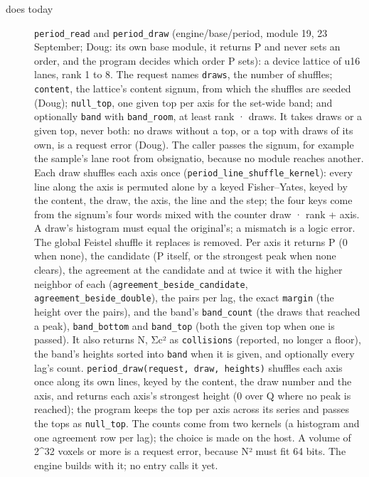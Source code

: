 \begin{description}
\item[{does today}] \texttt{period\_\allowbreak{}read} and \texttt{period\_\allowbreak{}draw} (engine/base/period, module 19, 23 September; Doug: its own base module, it returns P and never sets an order, and the program decides which order P sets): a device lattice of u16 lanes, rank 1 to 8. The request names \texttt{draws}, the number of shuffles; \texttt{content}, the lattice's content signum, from which the shuffles are seeded (Doug); \texttt{null\_\allowbreak{}top}, one given top per axis for the set-wide band; and optionally \texttt{band} with \texttt{band\_\allowbreak{}room}, at least rank · draws. It takes draws or a given top, never both: no draws without a top, or a top with draws of its own, is a request error (Doug). The caller passes the signum, for example the sample's lane root from obsignatio, because no module reaches another. Each draw shuffles each axis once (\texttt{period\_\allowbreak{}line\_\allowbreak{}shuffle\_\allowbreak{}kernel}): every line along the axis is permuted alone by a keyed Fisher–Yates, keyed by the content, the draw, the axis, the line and the step; the four keys come from the signum's four words mixed with the counter draw · rank + axis. A draw's histogram must equal the original's; a mismatch is a logic error. The global Feistel shuffle it replaces is removed. Per axis it returns P (0 when none), the candidate (P itself, or the strongest peak when none clears), the agreement at the candidate and at twice it with the higher neighbor of each (\texttt{agreement\_\allowbreak{}beside\_\allowbreak{}candidate}, \texttt{agreement\_\allowbreak{}beside\_\allowbreak{}double}), the pairs per lag, the exact \texttt{margin} (the height over the pairs), and the band's \texttt{band\_\allowbreak{}count} (the draws that reached a peak), \texttt{band\_\allowbreak{}bottom} and \texttt{band\_\allowbreak{}top} (both the given top when one is passed). It also returns N, Σc² as \texttt{collisions} (reported, no longer a floor), the band's heights sorted into \texttt{band} when it is given, and optionally every lag's count. \texttt{period\_\allowbreak{}draw(request, draw, heights)} shuffles each axis once along its own lines, keyed by the content, the draw number and the axis, and returns each axis's strongest height (0 over Q where no peak is reached); the program keeps the top per axis across its series and passes the tops as \texttt{null\_\allowbreak{}top}. The counts come from two kernels (a histogram and one agreement row per lag); the choice is made on the host. A volume of 2\textasciicircum{}32 voxels or more is a request error, because N² must fit 64 bits. The engine builds with it; no entry calls it yet.

\end{description}
